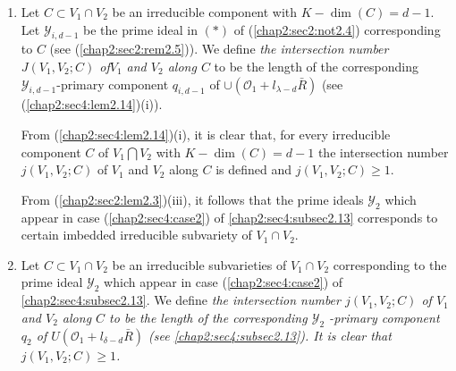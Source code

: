 \setcounter{definition}{14}
\begin{definition}\label{chap2:sec4:def2.15}
  \begin{enumerate}[\rm (a)]
  \item Let $C \subset V_1 \cap V_2$ be an irreducible component with
    $K-\dim (C)=d-1$. Let $\mathscr{Y}_{i,d-1}$ be the prime ideal in
    $(*)$ of (\ref{chap2:sec2:not2.4}) corresponding to $C$ (see
    (\ref{chap2:sec2:rem2.5})). We define \textit
    {the intersection number $J(V_1,V_2;C)$ of\pageoriginale $V_1$
      and $V_2$ along 
      $C$} to be the length of the corresponding
    $\mathscr{Y}_{i,d-1}$-primary component $q_{i,d-1}$ of
    $\cup(\mathscr{O}_1+l_{\lambda-d}\bar{R})$ (see
    (\ref{chap2:sec4:lem2.14})(i)).  
    
    From (\ref{chap2:sec4:lem2.14})(i), it is clear that, for every
    irreducible component 
    $C$ of $V_1 \bigcap V_2$ with $K-\dim (C)=d-1$ the intersection
    number $j(V_1,V_2;C)$ of $V_1$ and $V_2$ along $C$ is defined and
    $j(V_1,V_2;C) \geq 1$. 

    From (\ref{chap2:sec2:lem2.3})(iii), it follows that the prime
    ideals $\mathscr{Y}_2$ 
    which appear in case (\ref{chap2:sec4:case2}) of \ref{chap2:sec4:subsec2.13}
    corresponds to certain imbedded 
    irreducible subvariety of $V_1 \cap V_2$. 
  \item Let $C \subset V_1 \cap V_2$ be an irreducible subvarieties of
    $V_1 \cap V_2$ corresponding to the prime ideal $\mathscr{Y}_2$
    which appear in case (\ref{chap2:sec4:case2}) of
    \ref{chap2:sec4:subsec2.13}. We define \em{the
      intersection number $j(V_1,V_2;C)$ of $V_1$ and $V_2$ along $C$}
    to be the length of the corresponding $\mathscr{Y}_2$ -primary
    component $q_2$ of $U(\mathscr{O}_1 +l_{\delta -d}\bar{R})$ (see
    \ref{chap2:sec4:subsec2.13}). It is clear that $j(V_1,V_2;C)\geq 1$. 
  \end{enumerate}
\end{definition}

